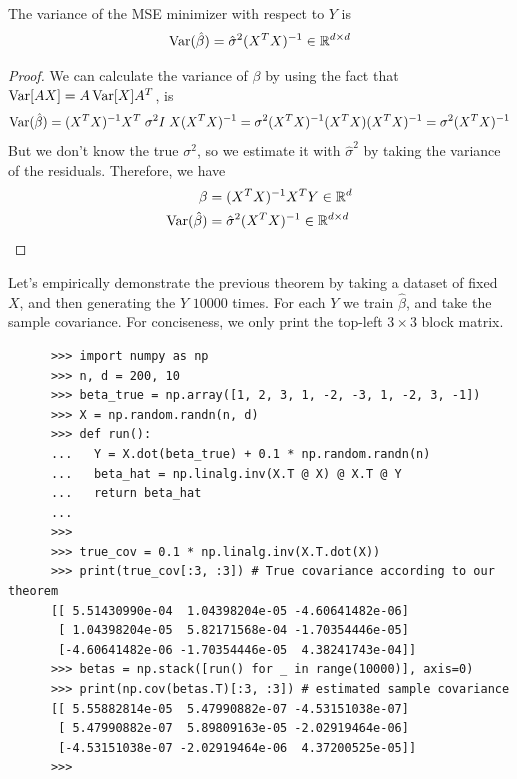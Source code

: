   \begin{corollary}
    \label{thm:variance-of-mse-minimizer}
    The variance of the MSE minimizer with respect to $Y$ is 
    \begin{equation}
      \operatorname{Var}(\hat{\beta}) = \hat{\sigma}^2 (X^T X)^{-1} \in \mathbb{R}^{d \times d}
    \end{equation}
  \end{corollary}
  \begin{proof}
    We can calculate the variance of $\beta$ by using the fact that $\operatorname{Var}[A X] = A \operatorname{Var}[X] A^T$, is
    \begin{equation}
      \operatorname{Var}(\hat{\beta}) = (X^{T} X)^{-1} X^{T} \;\sigma^2 I \; X  (X^{T} X)^{-1} = \sigma^2 (X^{T} X)^{-1} (X^{T} X)  (X^{T} X)^{-1} = \sigma^2  (X^{T} X)^{-1}
    \end{equation}
    But we don't know the true $\sigma^2$, so we estimate it with $\hat{\sigma}^2$ by taking the variance of the residuals. Therefore, we have 
    \begin{align}
      \beta & = (X^T X)^{-1} X^T Y \in \mathbb{R}^d \\
      \operatorname{Var}(\hat{\beta}) & = \hat{\sigma}^2 (X^T X)^{-1} \in \mathbb{R}^{d \times d}
    \end{align}
  \end{proof}

  \begin{example}[Simulation]
    \label{ex:simulation-2}
    Let's empirically demonstrate the previous theorem by taking a dataset of fixed $X$, and then generating the $Y$ $10000$ times. For each $Y$ we train $\hat{\beta}$, and take the sample covariance. For conciseness, we only print the top-left $3 \times 3$ block matrix. 

    \begin{lstlisting}
      >>> import numpy as np 
      >>> n, d = 200, 10
      >>> beta_true = np.array([1, 2, 3, 1, -2, -3, 1, -2, 3, -1])
      >>> X = np.random.randn(n, d)
      >>> def run(): 
      ...   Y = X.dot(beta_true) + 0.1 * np.random.randn(n)
      ...   beta_hat = np.linalg.inv(X.T @ X) @ X.T @ Y 
      ...   return beta_hat
      ... 
      >>> 
      >>> true_cov = 0.1 * np.linalg.inv(X.T.dot(X)) 
      >>> print(true_cov[:3, :3]) # True covariance according to our theorem
      [[ 5.51430990e-04  1.04398204e-05 -4.60641482e-06]
       [ 1.04398204e-05  5.82171568e-04 -1.70354446e-05]
       [-4.60641482e-06 -1.70354446e-05  4.38241743e-04]]
      >>> betas = np.stack([run() for _ in range(10000)], axis=0)
      >>> print(np.cov(betas.T)[:3, :3]) # estimated sample covariance
      [[ 5.55882814e-05  5.47990882e-07 -4.53151038e-07]
       [ 5.47990882e-07  5.89809163e-05 -2.02919464e-06]
       [-4.53151038e-07 -2.02919464e-06  4.37200525e-05]]
      >>> 
    \end{lstlisting}
  \end{example}


